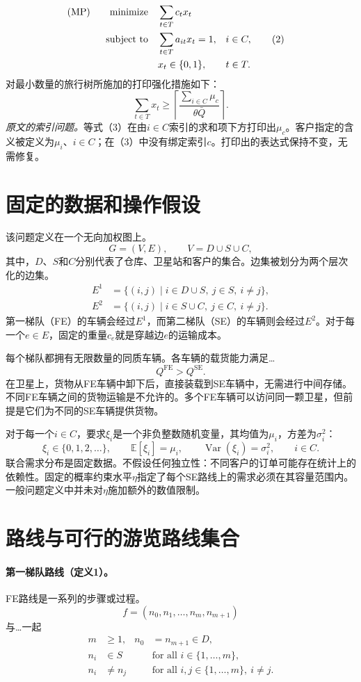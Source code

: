 \documentclass{article}
\begin{document}
\begin{align}
\text{(MP)}\qquad \text{minimize}\quad &\sum_{t\in T}c_t x_t \notag\\
\text{subject to}\quad &\sum_{t\in T}a_{it}x_t=1, &&i\in C, \tag{2}\\
&x_t\in\{0,1\}, &&t\in T. \notag
\end{align}
对最小数量的旅行树所施加的打印强化措施如下：
\begin{equation}
\sum_{t\in T}x_t\geq
\left\lceil\frac{\sum_{i\in C}\mu_c}{\theta\bar Q}\right\rceil.
\tag{3}
\end{equation}
\noindent\textit{原文的索引问题。}等式（3）在由$i\in C$索引的求和项下方打印出$\mu_c$。客户指定的含义被定义为$\mu_i$、$i\in C$；在（3）中没有绑定索引$c$。打印出的表达式保持不变，无需修复。

\section*{固定的数据和操作假设}
该问题定义在一个无向加权图上。
\[
G=(V,E),\qquad V=D\cup S\cup C,
\]
其中，$D$、$S$和$C$分别代表了仓库、卫星站和客户的集合。边集被划分为两个层次化的边集。
\begin{align*}
E^1&=\{(i,j)\mid i\in D\cup S,\ j\in S,\ i\neq j\},\\
E^2&=\{(i,j)\mid i\in S\cup C,\ j\in C,\ i\neq j\}.
\end{align*}
第一梯队（FE）的车辆会经过$E^1$，而第二梯队（SE）的车辆则会经过$E^2$。对于每一个$e\in E$，固定的重量$c_e$就是穿越边$e$的运输成本。

每个梯队都拥有无限数量的同质车辆。各车辆的载货能力满足…
\[
Q^{\mathrm{FE}}>Q^{\mathrm{SE}}.
\]
在卫星上，货物从FE车辆中卸下后，直接装载到SE车辆中，无需进行中间存储。不同FE车辆之间的货物运输是不允许的。多个FE车辆可以访问同一颗卫星，但前提是它们为不同的SE车辆提供货物。

对于每一个$i\in C$，要求$\xi_i$是一个非负整数随机变量，其均值为$\mu_i$，方差为$\sigma_i^2$：
\[
\xi_i\in\{0,1,2,\ldots\},\qquad
\mathbb E[\xi_i]=\mu_i,\qquad
\operatorname{Var}(\xi_i)=\sigma_i^2,
\qquad i\in C.
\]
联合需求分布是固定数据。不假设任何独立性：不同客户的订单可能存在统计上的依赖性。固定的概率约束水平$\eta$指定了每个SE路线上的需求必须在其容量范围内。一般问题定义中并未对$\eta$施加额外的数值限制。

\section*{路线与可行的游览路线集合}
\paragraph{第一梯队路线（定义1）。}
FE路线是一系列的步骤或过程。
\[
f=(n_0,n_1,\ldots,n_m,n_{m+1})
\]
与…一起
\begin{align*}
m&\geq1, & n_0&=n_{m+1}\in D,\\
n_i&\in S &&\text{for all }i\in\{1,\ldots,m\},\\
n_i&\neq n_j &&\text{for all }i,j\in\{1,\ldots,m\},\ i\neq j.
\end{align*}
\end{document}
